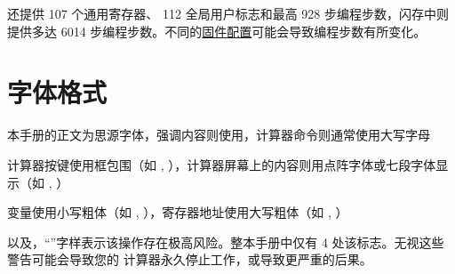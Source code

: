 \wpx 还提供 107 个通用寄存器、 112 全局用户标志和最高 928 步编程步数，闪存中则提供多达 6014 
步编程步数。不同的\hyperref[chapter:modding]{固件配置}可能会导致编程步数有所变化。

\section{字体格式}

\li
\item 本手册的正文为思源字体，强调内容则使用，计算器命令则通常使用大写字母
\item 计算器按键使用框包围（如 , \keyH ），计算器屏幕上的内容则用点阵字体或七段字体显示（如 , ）
\item 变量使用小写粗体（如 , ），寄存器地址使用大写粗体（如 , ）
\lix

以及，``''字样表示该操作存在极高风险。整本手册中仅有 4 处该标志。无视这些警告可能会导致您的
计算器永久停止工作，或导致更严重的后果。
